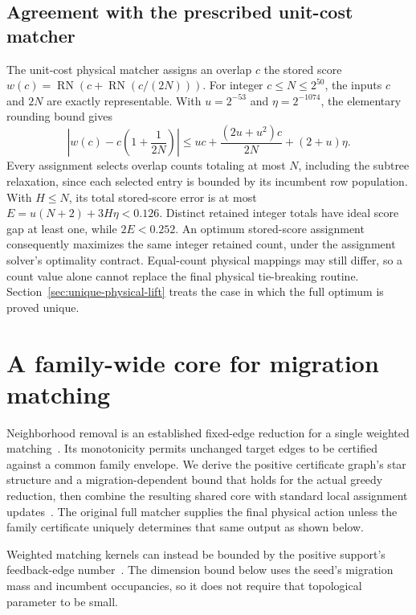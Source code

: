 \documentclass[11pt]{article}
\begin{document}
\subsection{Agreement with the prescribed unit-cost matcher}
The unit-cost physical matcher assigns an overlap $c$ the stored score $w(c)=\operatorname{RN}(c+\operatorname{RN}(c/(2N)))$. For integer $c\le N\le2^{50}$, the inputs $c$ and $2N$ are exactly representable. With $u=2^{-53}$ and $\eta=2^{-1074}$, the elementary rounding bound gives
\begin{equation}
\left|w(c)-c\left(1+\frac1{2N}\right)\right|
\le uc+\frac{(2u+u^2)c}{2N}+(2+u)\eta.
\end{equation}
Every assignment selects overlap counts totaling at most $N$, including the subtree relaxation, since each selected entry is bounded by its incumbent row population. With $H\le N$, its total stored-score error is at most $E=u(N+2)+3H\eta<0.126$. Distinct retained integer totals have ideal score gap at least one, while $2E<0.252$. An optimum stored-score assignment consequently maximizes the same integer retained count, under the assignment solver's optimality contract. Equal-count physical mappings may still differ, so a count value alone cannot replace the final physical tie-breaking routine. Section~\ref{sec:unique-physical-lift} treats the case in which the full optimum is proved unique.

\section{A family-wide core for migration matching}\label{sec:migration-core}

Neighborhood removal is an established fixed-edge reduction for a single weighted matching~\cite{grossmann2026hypergraph}. Its monotonicity permits unchanged target edges to be certified against a common family envelope. We derive the positive certificate graph's star structure and a migration-dependent bound that holds for the actual greedy reduction, then combine the resulting shared core with standard local assignment updates~\cite{millstettey2007dynamic,morita2024update}. The original full matcher supplies the final physical action unless the family certificate uniquely determines that same output as shown below.

Weighted matching kernels can instead be bounded by the positive support's feedback-edge number~\cite{korenwein2018reduction}. The dimension bound below uses the seed's migration mass and incumbent occupancies, so it does not require that topological parameter to be small.
\end{document}
